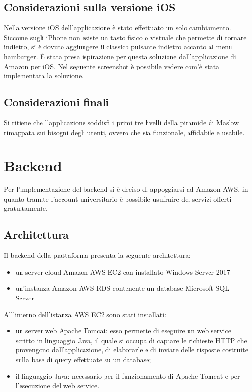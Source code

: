 \documentclass[12pt, a4paper, titlepage]{report}
\begin{document}
	\subsection{Considerazioni sulla versione iOS}
	
	Nella versione iOS dell'applicazione è stato effettuato un solo cambiamento. Siccome sugli iPhone non esiste un tasto fisico o vistuale che permette di tornare indietro, si è dovuto aggiungere il classico pulsante indietro accanto al menu hamburger. È stata presa ispirazione per questa soluzione dall'applicazione di Amazon per iOS. Nel seguente screenshot è possibile vedere com'è stata implementata la soluzione.
	
	\subsection{Considerazioni finali}
	Si ritiene che l'applicazione soddisfi i primi tre livelli della piramide di Maslow rimappata sui bisogni degli utenti, ovvero che sia funzionale, affidabile e usabile.
	
	\section{Backend}
	Per l'implementazione del backend si è deciso di appoggiarsi ad Amazon AWS, in quanto tramite l'account universitario è possibile usufruire dei servizi offerti gratuitamente.
	\subsection{Architettura}
	Il backend della piattaforma presenta la seguente architettura:
	\begin{itemize}
		\item un server cloud Amazon AWS EC2 con installato Windows Server 2017;
		\item un'instanza Amazon AWS RDS contenente un database Microsoft SQL Server.
	\end{itemize}

	All'interno dell'istanza AWS EC2 sono stati installati:
	\begin{itemize}
		\item un server web Apache Tomcat: esso permette di eseguire un web service scritto in linguaggio Java, il quale si occupa di captare le richieste HTTP che provengono dall'applicazione, di elaborarle e di inviare delle risposte costruite sulla base di query effettuate su un database;
		\item il linguaggio Java: necessario per il funzionamento di Apache Tomcat e per l'esecuzione del web service.
	\end{itemize}
\end{document}
